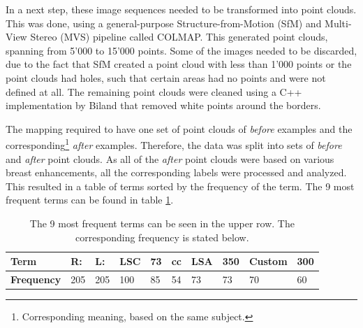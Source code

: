 In a next step, these image sequences needed to be transformed into point clouds. This was done, using a general-purpose Structure-from-Motion (SfM) \cite{schoenberger2016sfm} and Multi-View Stereo (MVS) \cite{schoenberger2016mvs} pipeline called COLMAP. This generated point clouds, spanning from 5'000 to 15'000 points. Some of the images needed to be discarded, due to the fact that SfM created a point cloud with less than 1'000 points or the point clouds had holes, such that certain areas had no points and were not defined at all. The remaining point clouds were cleaned using a C++ implementation by Biland \cite{Biland17} that removed white points around the borders.

The mapping required to have one set of point clouds of \textit{before} examples and the corresponding\footnote{Corresponding meaning, based on the same subject.} \textit{after} examples. Therefore, the data was split into sets of \textit{before} and \textit{after} point clouds. As all of the \textit{after} point clouds were based on various breast enhancements, all the corresponding labels were processed and analyzed. This resulted in a table of terms sorted by the frequency of the term. The 9 most frequent terms can be found in table \ref{tableTerms}.

\begin{table}[h]
\centering
\begin{tabular}{|l|l|l|l|l|l|l|l|l|l|}
\hline
\textbf{Term}      & \textbf{R:} & \textbf{L:} & \textbf{LSC} & \textbf{73} & \textbf{cc} & \textbf{LSA} & \textbf{350} & \textbf{Custom} & \textbf{300} \\ \hline
\textbf{Frequency} & 205         & 205         & 100          & 85          & 54          & 73           & 73           & 70              & 60           \\ \hline
\end{tabular}
\caption[Table of most frequent terms]{The 9 most frequent terms can be seen in the upper row. The corresponding frequency is stated below.}
\label{tableTerms}
\end{table}

